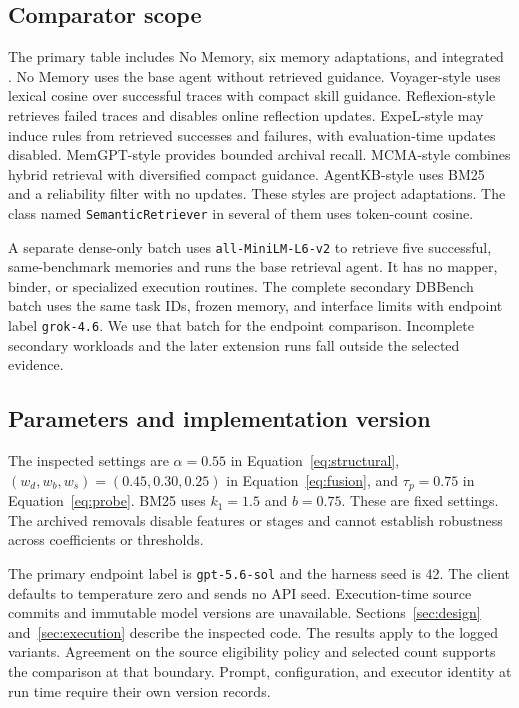 \subsection{Comparator scope}
The primary table includes No Memory, six memory adaptations, and integrated \SM{}. No Memory uses the base agent without retrieved guidance. Voyager-style \cite{wang2024voyager} uses lexical cosine over successful traces with compact skill guidance. Reflexion-style \cite{shinn2023reflexion} retrieves failed traces and disables online reflection updates. ExpeL-style \cite{zhao2024expel} may induce rules from retrieved successes and failures, with evaluation-time updates disabled. MemGPT-style \cite{packer2023memgpt} provides bounded archival recall. MCMA-style \cite{liang2026mcma} combines hybrid retrieval with diversified compact guidance. AgentKB-style \cite{tang2025agentkb} uses BM25 and a reliability filter with no updates. These styles are project adaptations. The class named \texttt{SemanticRetriever} in several of them uses token-count cosine.

A separate dense-only batch uses \texttt{all-MiniLM-L6-v2} to retrieve five successful, same-benchmark memories and runs the base retrieval agent. It has no \SM{} mapper, binder, or specialized execution routines. The complete secondary DBBench batch uses the same task IDs, frozen memory, and interface limits with endpoint label \texttt{grok-4.6}. We use that batch for the endpoint comparison. Incomplete secondary workloads and the later extension runs fall outside the selected evidence.

\subsection{Parameters and implementation version}
The inspected settings are $\alpha=0.55$ in Equation~\ref{eq:structural}, $(w_d,w_b,w_s)=(0.45,0.30,0.25)$ in Equation~\ref{eq:fusion}, and $\tau_p=0.75$ in Equation~\ref{eq:probe}. BM25 uses $k_1=1.5$ and $b=0.75$. These are fixed settings. The archived removals disable features or stages and cannot establish robustness across coefficients or thresholds.

The primary endpoint label is \texttt{gpt-5.6-sol} and the harness seed is 42. The client defaults to temperature zero and sends no API seed. Execution-time source commits and immutable model versions are unavailable. Sections~\ref{sec:design} and~\ref{sec:execution} describe the inspected code. The results apply to the logged variants. Agreement on the source eligibility policy and selected count supports the comparison at that boundary. Prompt, configuration, and executor identity at run time require their own version records.

